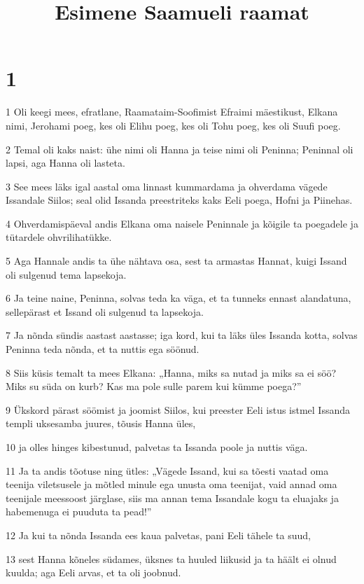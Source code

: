 

\title{Esimene Saamueli raamat}

\chapter{1}

\par 1 Oli keegi mees, efratlane, Raamataim-Soofimist Efraimi mäestikust, Elkana nimi, Jerohami poeg, kes oli Elihu poeg, kes oli Tohu poeg, kes oli Suufi poeg.
\par 2 Temal oli kaks naist: ühe nimi oli Hanna ja teise nimi oli Peninna; Peninnal oli lapsi, aga Hanna oli lasteta.
\par 3 See mees läks igal aastal oma linnast kummardama ja ohverdama vägede Issandale Siilos; seal olid Issanda preestriteks kaks Eeli poega, Hofni ja Piinehas.
\par 4 Ohverdamispäeval andis Elkana oma naisele Peninnale ja kõigile ta poegadele ja tütardele ohvrilihatükke.
\par 5 Aga Hannale andis ta ühe nähtava osa, sest ta armastas Hannat, kuigi Issand oli sulgenud tema lapsekoja.
\par 6 Ja teine naine, Peninna, solvas teda ka väga, et ta tunneks ennast alandatuna, sellepärast et Issand oli sulgenud ta lapsekoja.
\par 7 Ja nõnda sündis aastast aastasse; iga kord, kui ta läks üles Issanda kotta, solvas Peninna teda nõnda, et ta nuttis ega söönud.
\par 8 Siis küsis temalt ta mees Elkana: „Hanna, miks sa nutad ja miks sa ei söö? Miks su süda on kurb? Kas ma pole sulle parem kui kümme poega?”
\par 9 Ükskord pärast söömist ja joomist Siilos, kui preester Eeli istus istmel Issanda templi uksesamba juures, tõusis Hanna üles,
\par 10 ja olles hinges kibestunud, palvetas ta Issanda poole ja nuttis väga.
\par 11 Ja ta andis tõotuse ning ütles: „Vägede Issand, kui sa tõesti vaatad oma teenija viletsusele ja mõtled minule ega unusta oma teenijat, vaid annad oma teenijale meessoost järglase, siis ma annan tema Issandale kogu ta eluajaks ja habemenuga ei puuduta ta pead!”
\par 12 Ja kui ta nõnda Issanda ees kaua palvetas, pani Eeli tähele ta suud,
\par 13 sest Hanna kõneles südames, üksnes ta huuled liikusid ja ta häält ei olnud kuulda; aga Eeli arvas, et ta oli joobnud.
